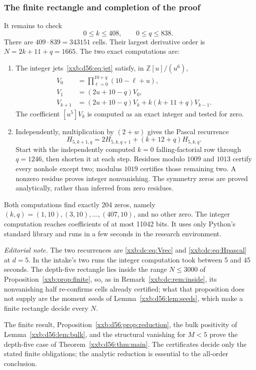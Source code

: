 \documentclass[11pt,a4paper]{article}
\numberwithin{equation}{section}
\theoremstyle{definition}
\theoremstyle{remark}
\theoremstyle{plain}
\newcommand{\Z}{\mathbb Z}
\begin{document}
\subsubsection{The finite rectangle and completion of the proof}

It remains to check
\[
 0\le k\le408,\qquad0\le q\le838.
\]
There are $409\cdot839=343151$ cells. Their largest derivative order is
$N=2k+11+q=1665$. The two exact computations are:
\begin{enumerate}[leftmargin=1.8em,itemsep=2pt]
\item The integer jets~\eqref{xxb:d56:eq:jet} satisfy, in $\Z[u]/(u^6)$,
\begin{align*}
 V_0&=\prod_{\ell=0}^{10+q}(10-\ell+u),\\
 V_1&=(2u+10-q)V_0,\\
 V_{k+1}&=(2u+10-q)V_k+k(k+11+q)V_{k-1}.
\end{align*}
The coefficient $[u^5]V_k$ is computed as an exact integer and tested for
zero.
\item Independently, multiplication by $(2+w)$ gives the Pascal recurrence
\[
 H_{5,k+1,q}=2H_{5,k,q+1}+(k+12+q)H_{5,k,q}.
\]
Start with the independently computed $k=0$ falling-factorial row through
$q=1246$, then shorten it at each step. Residues modulo $1009$ and $1013$
certify every nonhole except two; modulus $1019$ certifies those remaining
two. A nonzero residue proves integer nonvanishing. The symmetry zeros are
proved analytically, rather than inferred from zero residues.
\end{enumerate}
Both computations find exactly 204 zeros, namely
$(k,q)=(1,10),(3,10),\ldots,(407,10)$, and no other zero. The integer
computation reaches coefficients of at most 11042 bits. It uses only Python's
standard library and runs in a few seconds in the research environment.

\emph{Editorial note.}  The two recurrences are \eqref{xxb:dc:eq:Vrec} and
\eqref{xxb:dc:eq:Hpascal} at $d=5$.  In the intake's two runs the integer
computation took between 5 and 45 seconds.  The depth-five rectangle lies inside the range
$N\le3000$ of Proposition~\ref{xxb:prop:finite}, so, as in
Remark~\ref{xxb:dc:rem:inside}, its nonvanishing half re-confirms cells
already certified; what that proposition does not supply are the moment seeds
of Lemma~\ref{xxb:d56:lem:seeds}, which make a finite rectangle decide every
$N$.

The finite result, Proposition~\ref{xxb:d56:prop:reduction}, the bulk
positivity of Lemma~\ref{xxb:d56:lem:bulk}, and the structural vanishing for
$M<5$ prove the depth-five case of Theorem~\ref{xxb:d56:thm:main}. The
certificates decide only the stated finite obligations; the analytic reduction
is essential to the all-order conclusion.
\end{document}
